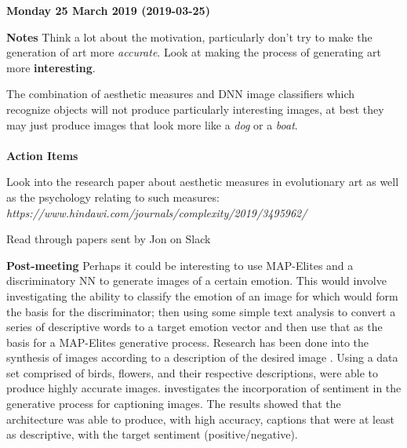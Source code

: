 \documentclass[10pt,a4paper]{article}
\begin{document}
	\begin{center} \textbf{Monday 25 March 2019 (2019-03-25)} \end{center} 
	
	\textbf{Notes}
	Think a lot about the motivation, particularly don't try to make the generation of art more \textit{accurate}. Look at making the process of generating art more \textbf{interesting}.
	
	The combination of aesthetic measures and DNN image classifiers which recognize objects will not produce particularly interesting images, at best they may just produce images that look more like a \textit{dog} or a \textit{boat}.
	\\\\
	\textbf{Action Items}
	\begin{todolist}
		\item Look into the research paper about aesthetic measures in evolutionary art as well as the psychology relating to such measures:\\
		\textit{https://www.hindawi.com/journals/complexity/2019/3495962/}
		\item Read through papers sent by Jon on Slack
	\end{todolist}
	\textbf{Post-meeting}
	Perhaps it could be interesting to use MAP-Elites and a discriminatory NN to generate images of a certain emotion. This would involve investigating the ability to classify the emotion of an image for which would form the basis for the discriminator; then using some simple text analysis to convert a series of descriptive words to a target emotion vector and then use that as the basis for a MAP-Elites generative process.
	Research has been done into the synthesis of images according to a description of the desired image \citep{reed2016generative}.
	Using a data set comprised of birds, flowers, and their respective descriptions, \citet{reed2016generative} were able to produce highly accurate images.
	\citet{mathews2016senticap} investigates the incorporation of sentiment in the generative process for captioning images.
	The results showed that the architecture was able to produce, with high accuracy, captions that were at least as descriptive, with the target sentiment (positive/negative).
	
	
	
	
	
\end{document}
